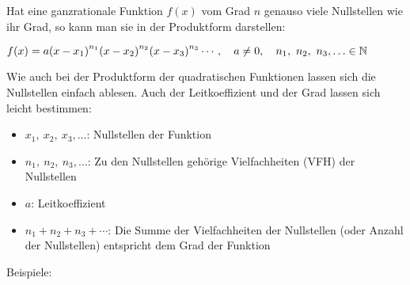 Hat eine ganzrationale Funktion \(f(x)\) vom Grad \(n\) genauso viele Nullstellen wie ihr Grad, so kann man sie in der Produktform darstellen:

\(f(x)=a\left(x-x_1 \right)^{n_1} \left(x-x_2 \right)^{n_2}\left(x-x_3 \right)^{n_3} \cdots, \quad a\neq 0, \quad n_1,\ n_2,\ n_3,\ldots\in\N\)

Wie auch bei der Produktform der quadratischen Funktionen lassen sich die Nullstellen einfach ablesen. Auch der Leitkoeffizient und der Grad lassen sich leicht bestimmen:
\begin{itemize}\large
	\item[\textcolor{loes}{\textbullet}] \textcolor{loes}{\(x_1,\ x_2,\ x_3,\ldots\): Nullstellen der Funktion}
	\item[\textcolor{loes}{\textbullet}]  \textcolor{loes}{\(n_1,\ n_2,\ n_3,\ldots\): Zu den Nullstellen gehörige Vielfachheiten (VFH) der Nullstellen}
	\item[\textcolor{loes}{\textbullet}]  \textcolor{loes}{\(a\): Leitkoeffizient}
	\item[\textcolor{loes}{\textbullet}]  \textcolor{loes}{\(n_1+n_2+n_3+\cdots\): Die Summe der Vielfachheiten der Nullstellen (oder Anzahl der Nullstellen) entspricht dem Grad der Funktion}
\end{itemize}\vspace{2cm}
Beispiele:

